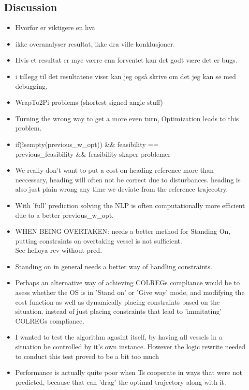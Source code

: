 \subsection{Discussion}\label{CHAP: discussion}
\begin{itemize}
    \item Hvorfor er viktigere en hva
    \item ikke overanalyser resultat, ikke dra ville konklusjoner.
    \item Hvis et resultat er mye værre enn forventet kan det godt være det er bugs.
    \item i tillegg til det resultatene viser kan jeg også skrive om det jeg kan se med debugging.
    \item WrapTo2Pi problems (shortest signed angle stuff)
    \item Turning the wrong way to get a more even turn, Optimization leads to this problem. 
    \item if(\~isempty(previous\_w\_opt)) \&\& feasibility == \\
     previous\_feasibility \&\& feasibility     skaper problemer 
    \item We really don't want to put a cost on heading reference more than neccessary, heading will often not be correct due to disturbances.
    heading is also just plain wrong any time we deviate from the reference trajecotry.
    \item With 'full' prediction solving the NLP is often computationally more efficient due to a better previous\_w\_opt.
    \item WHEN BEING OVERTAKEN: needs a better method for Standing On, putting constraints on overtaking vessel is not sufficient. \\
    See helloya rev without pred.
    \item Standing on in general needs a better way of handling constraints.
    \item Perhaps an alternative way of achieving COLREGs compliance would be to asess whether the \gls{OS} is in 'Stand on' or
    'Give way' mode, and modifying the cost function as well as dynamically placing constraints based on the situation. instead of
    just placing constraints that lead to 'immitating' COLREGs compliance.
    \item I wanted to test the algorithm agasint itself, by having all vessels in a situation be controlled by it's own instance.
    However the logic rewrite needed to conduct this test proved to be a bit too much
    \item Performance is actually quite poor when \gls{Ts} cooperate in ways that were not predicted, because
    that can 'drag' the optimal trajectory along with it.
\end{itemize}

